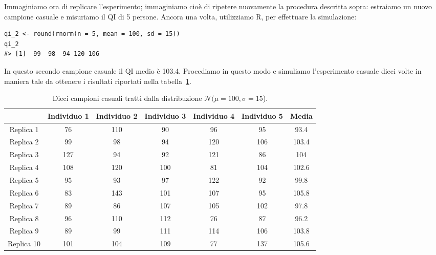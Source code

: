 Immaginiamo ora di replicare l'esperimento; immaginiamo cioè di ripetere nuovamente la procedura descritta sopra: estraiamo un nuovo campione casuale e misuriamo il QI di 5 persone. 
Ancora una volta, utilizziamo R, per effettuare la simulazione:
\begin{lstlisting}
qi_2 <- round(rnorm(n = 5, mean = 100, sd = 15))
qi_2
#> [1]  99  98  94 120 106
\end{lstlisting}
\noindent
In questo secondo campione casuale il QI medio è 103.4.
Procediamo in questo modo e simuliamo l'esperimento casuale dieci volte in maniera tale da ottenere i risultati riportati nella tabella~\ref{tab:samples_5obs}.

\begin{table}[h!]
\footnotesize
\caption{Dieci campioni casuali tratti dalla distribuzione $\mathcal{N}(\mu = 100, \sigma = 15$).}
\begin{center}
\begin{tabular}{ccccccc}
\toprule
 & Individuo 1 & Individuo 2 & Individuo 3 & Individuo 4 & Individuo 5 & Media \\
 \midrule
Replica 1 & 76 &110 & 90 & 96 & 95 & 93.4\\
Replica 2 & 99 & 98 & 94& 120& 106 & 103.4\\
Replica 3 & 127 & 94 & 92 &121&  86 & 104\\
Replica 4 & 108 &120 &100 & 81 &104 & 102.6\\
Replica 5 & 95  &93 & 97 &122 & 92 & 99.8\\
Replica 6 & 83 &143 &101& 107 & 95 & 105.8\\
Replica 7 & 89 & 86 &107 &105 &102 & 97.8\\
Replica 8 & 96 &110 &112 & 76 & 87 & 96.2\\
Replica 9 & 89 & 99 &111 &114& 106 & 103.8\\
Replica 10 & 101& 104& 109 & 77& 137 & 105.6\\
\bottomrule
\end{tabular}
\end{center}
\label{tab:samples_5obs}
\end{table}%

